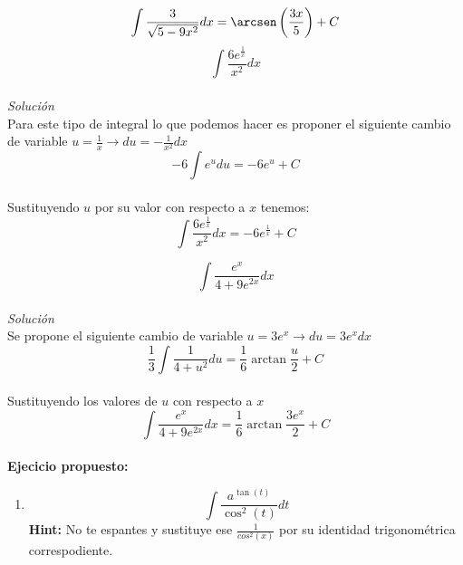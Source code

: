 \documentclass[10pt]{article}
\begin{document}
\[\int \frac{3}{\sqrt{5-9x^{2}}}dx = \arcsen\left(\frac{3x}{5}\right) + C\]
\vspace{1.5cm}
\clearpage
\[\int \frac{6 e^{\frac{1}{x}}}{x^{2}}dx\]\\
\textit{Solución}\\
Para este tipo de integral lo que podemos hacer es proponer el siguiente cambio de variable $u = \frac{1}{x} \rightarrow du=-\frac{1}{x^{2}}dx$\\
\[-6\int e^{u}du = -6 e^{u} + C \]\\
Sustituyendo $u$ por su valor con respecto a $x$ tenemos:\\
\[\int \frac{6 e^{\frac{1}{x}}}{x^{2}}dx=-6 e^{\frac{1}{x}} + C\]

\vspace{1cm}
\[\int\frac{e^{x}}{4 + 9 e^{2x}}dx\]
\\
\textit{Solución}\\
Se propone el siguiente cambio de variable $u=3e^{x}\rightarrow du= 3e^{x}dx$\\
\[\frac{1}{3}\int \frac{1}{4+u^{2}}du=\frac{1}{6}\arctan{\frac{u}{2}}+C\]
\\Sustituyendo los valores de $u$ con respecto a $x$\\
\[\int\frac{e^{x}}{4 + 9 e^{2x}}dx = \frac{1}{6}\arctan{\frac{3e^{x}}{2}}+C\]\\
\textbf{Ejecicio propuesto:}\\
\begin{enumerate}
  \item \[\int \frac{a^{\tan(t)}}{\cos^{2}(t)}dt\]
  \textbf{Hint:} No te espantes y sustituye ese $\frac{1}{cos^{2}(x)}$ por su identidad trigonométrica correspodiente.
\end{enumerate}


\clearpage
\end{document}
